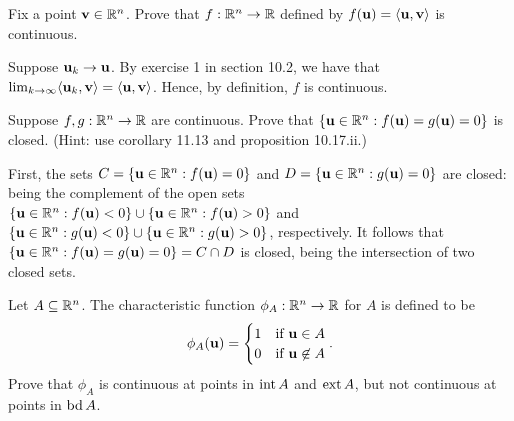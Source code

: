 \documentclass[letterpaper, twoside, 12pt]{book}
\begin{document}
\begin{exercise}[3]
  Fix a point \(\mathbf v\in\mathbb R^n\). Prove that \(f:\mathbb R^n\to\mathbb R\)
  defined by \(f(\mathbf u)=\langle\mathbf u,\mathbf v\rangle\) is continuous.
\end{exercise}

\begin{solution}
    Suppose \(\mathbf u_k \to \mathbf u\). By exercise 1 in section 10.2,
    we have that 
    \(\lim_{k \to \infty} \langle\mathbf u_k, \mathbf v\rangle = \langle\mathbf u, \mathbf v\rangle\).
    Hence, by definition, \(f\) is continuous.
\end{solution}

\begin{exercise}[6]
  Suppose \(f,g:\mathbb R^n\to\mathbb R\) are continuous. Prove that
  \(\{\mathbf u\in\mathbb R^n:f(\mathbf u)=g(\mathbf u)=0\}\) is closed.
  (Hint: use corollary 11.13 and proposition 10.17.ii.)
\end{exercise}

\begin{solution}
    First, the sets \(C = \{\mathbf u \in \mathbb R^n : f(\mathbf u) = 0\}\)
    and \(D = \{\mathbf u \in \mathbb R^n: g(\mathbf u) = 0\}\) are closed:
    being the complement of the open sets
    \(\{\mathbf u \in \mathbb R^n : f(\mathbf u) < 0\} \cup 
      \{\mathbf u \in \mathbb R^n : f(\mathbf u) > 0\} \)
    and
    \(\{\mathbf u \in \mathbb R^n : g(\mathbf u) < 0\} \cup 
      \{\mathbf u \in \mathbb R^n : g(\mathbf u) > 0\} \), respectively.
    It follows that 
    \(\{\mathbf u \in \mathbb R^n : f(\mathbf u) = g(\mathbf u) = 0\} = C \cap D\)
    is closed, being the intersection of two closed sets.
\end{solution}

\begin{exercise}[11]
  Let \(A\subseteq\mathbb R^n\). The characteristic function
  \(\phi_A:\mathbb R^n\to\mathbb R\) for \(A\) is defined to be
  \[
    \phi_A(\mathbf u) =
    \begin{cases}
      1 & \text{if } \mathbf u\in A \\
      0 & \text{if } \mathbf u\not\in A
    \end{cases}
  .\]
  Prove that \(\phi_A\) is continuous at points in \(\operatorname{int} A\)
  and \(\operatorname{ext} A\), but not continuous at points in \(\operatorname{bd} A\).
\end{exercise}
\begin{solution}

\end{solution}
\end{document}
